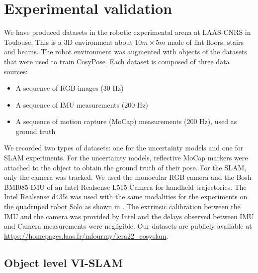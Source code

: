 \section{Experimental validation}

We have produced datasets in the robotic experimental arena at LAAS-CNRS in Toulouse. This is a 3D environment about $10 m \times 5m$ made of flat floors, 
stairs and beams. The robot environment was augmented with objects of the datasets that were used to train CosyPose. Each dataset is composed of three data sources:

\begin{itemize}
    \item A sequence of RGB images (30 Hz)
    \item A sequence of IMU measurements (200 Hz)
    \item A sequence of motion capture (MoCap) measurements (200 Hz), used as ground truth 
\end{itemize}

We recorded two types of datasets: one for the uncertainty models and one for SLAM experiments. For the uncertainty models, reflective MoCap markers 
were attached to the object to obtain the ground truth of their pose. For the SLAM, only the camera was tracked. We used the monocular RGB camera and the Bosh BMI085 
IMU of an Intel Realsense L515 Camera for handheld trajectories. The Intel Realsense d435i was used with the same modalities 
for the experiments on the quadruped robot Solo \cite{grimminger2020open} as shown in . 
The extrinsic calibration between the IMU and the camera was provided by Intel and the delays observed between IMU and Camera measurements were negligible. 
Our datasets are publicly available at \url{https://homepages.laas.fr/mfourmy/icra22_cosyslam}.





\subsection{Object level VI-SLAM}

